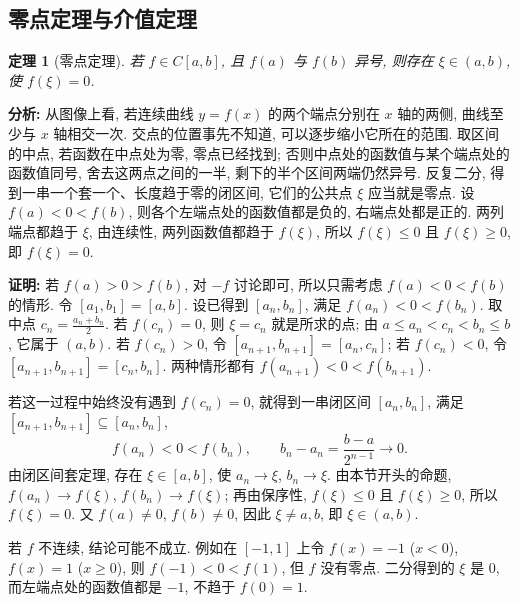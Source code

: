 \documentclass[UTF8,openany]{ctexbook}
\theoremstyle{chinesetextbook}
\newtheorem{theorem}{定理}[section]
\newenvironment{cnproof}{\par\indent\textbf{证明:} \ignorespaces}{\par}
\begin{document}
\subsection{零点定理与介值定理}
\begin{theorem}[零点定理]
若 $f\in C[a,b]$, 且 $f(a)$ 与 $f(b)$ 异号, 则存在 $\xi\in(a,b)$, 使 $f(\xi)=0$.
\end{theorem}
\par\indent\textbf{分析:} 从图像上看, 若连续曲线 $y=f(x)$ 的两个端点分别在 $x$ 轴的两侧, 曲线至少与 $x$ 轴相交一次. 交点的位置事先不知道, 可以逐步缩小它所在的范围. 取区间的中点, 若函数在中点处为零, 零点已经找到; 否则中点处的函数值与某个端点处的函数值同号, 舍去这两点之间的一半, 剩下的半个区间两端仍然异号. 反复二分, 得到一串一个套一个、长度趋于零的闭区间, 它们的公共点 $\xi$ 应当就是零点. 设 $f(a)<0<f(b)$, 则各个左端点处的函数值都是负的, 右端点处都是正的. 两列端点都趋于 $\xi$, 由连续性, 两列函数值都趋于 $f(\xi)$, 所以 $f(\xi)\le0$ 且 $f(\xi)\ge0$, 即 $f(\xi)=0$.
\begin{cnproof}
若 $f(a)>0>f(b)$, 对 $-f$ 讨论即可, 所以只需考虑 $f(a)<0<f(b)$ 的情形. 令 $[a_1,b_1]=[a,b]$. 设已得到 $[a_n,b_n]$, 满足 $f(a_n)<0<f(b_n)$. 取中点 $\displaystyle c_n=\frac{a_n+b_n}2$. 若 $f(c_n)=0$, 则 $\xi=c_n$ 就是所求的点; 由 $a\le a_n<c_n<b_n\le b$, 它属于 $(a,b)$. 若 $f(c_n)>0$, 令 $[a_{n+1},b_{n+1}]=[a_n,c_n]$; 若 $f(c_n)<0$, 令 $[a_{n+1},b_{n+1}]=[c_n,b_n]$. 两种情形都有 $f(a_{n+1})<0<f(b_{n+1})$.

若这一过程中始终没有遇到 $f(c_n)=0$, 就得到一串闭区间 $[a_n,b_n]$, 满足 $[a_{n+1},b_{n+1}]\subseteq[a_n,b_n]$,
\[
f(a_n)<0<f(b_n),\qquad b_n-a_n=\frac{b-a}{2^{n-1}}\to0.
\]
由闭区间套定理, 存在 $\xi\in[a,b]$, 使 $a_n\to\xi$, $b_n\to\xi$. 由本节开头的命题, $f(a_n)\to f(\xi)$, $f(b_n)\to f(\xi)$; 再由保序性, $f(\xi)\le0$ 且 $f(\xi)\ge0$, 所以 $f(\xi)=0$. 又 $f(a)\ne0$, $f(b)\ne0$, 因此 $\xi\ne a,b$, 即 $\xi\in(a,b)$.
\end{cnproof}
若 $f$ 不连续, 结论可能不成立. 例如在 $[-1,1]$ 上令 $f(x)=-1$ ($x<0$), $f(x)=1$ ($x\ge0$), 则 $f(-1)<0<f(1)$, 但 $f$ 没有零点. 二分得到的 $\xi$ 是 $0$, 而左端点处的函数值都是 $-1$, 不趋于 $f(0)=1$.
\end{document}
